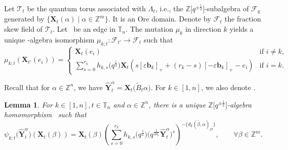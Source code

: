 \documentclass[10pt,a4paper]{amsart}
\newcommand{\Z}{\mathbb{Z}}
\numberwithin{equation}{section}
\newtheorem{Lemma}[Theorem]{Lemma}
\begin{document}
Let $\mathcal{T}_{t}$ be the quantum torus associated with $\Lambda_{t}$, i.e., the $\Z\big[q^{\pm\frac{1}{2}}\big]$-subalgebra of $\mathcal{F}_q$ generated by $\{\mathbf{X}_t(\alpha)\mid \alpha\in \Z^m\}$. It is an Ore domain. Denote by $\mathcal{F}_t$ the fraction skew field of $\mathcal{T}_t$.
Let~ be an edge in $\mathbb{T}_n$. The mutation $\mu_k$ in direction $k$ yields a unique \smash{$\Z\big[q^{\pm\frac{1}{2}}\big]$}-algebra isomorphism $\mu_{k;t}\colon\mathcal{F}_{t'}\to \mathcal{F}_t$ such that
\[
 \mu_{k;t}(\mathbf{X}_{t'}(e_i))=\begin{cases}
 \mathbf{X}_t(e_i) &\text{if $i\neq k$,}\\
 \displaystyle \sum\limits_{s=0}^{r_k}h_{k,s}\bigl(q^{\frac{1}{2}}\bigr)\mathbf{X}_t(s[\varepsilon \mathbf{b}_k]_{+}+(r_{k}-s)[-\varepsilon \mathbf{b}_k]_+-e_i)&\text{if $i=k$.}
 \end{cases}
\]

Recall that for $\alpha\in \Z^n$, we have $\hat{\mathbf{Y}}_t^\alpha=\mathbf{X}_t\bigl(\tilde{B}_t\alpha\bigr)$. For $k\in [1,n]$, we also denote .
\begin{Lemma}
 For $k\in[1,n],t\in\mathbb{T}_{n}$ and $\alpha\in\mathbb{Z}^{n}$, there is a unique $\Z\big[q^{\pm\frac{1}{2}}\big]$-algebra homomorphism~ such that
 \[
\psi_{k;t}\bigl(\mathbf{\hat{Y}}_{t}^{\alpha}\bigr)(\mathbf{X}_t(\beta))=\mathbf{X}_{t}(\beta)\left(\sum\limits_{s=0}^{r_k} h_{k,s}\bigl(q^{\frac{1}{2}}\bigr)\bigl(q^{\frac{1}{2d_{k}}}\mathbf{\hat{Y}}_{t}^{\alpha}\bigr)^{s}\right)^{-\{d_{k}(\bar{\beta},\alpha)_D\}}, \qquad \forall \beta\in \mathbb{Z}^m.
 \]
 \end{Lemma}
\end{document}
